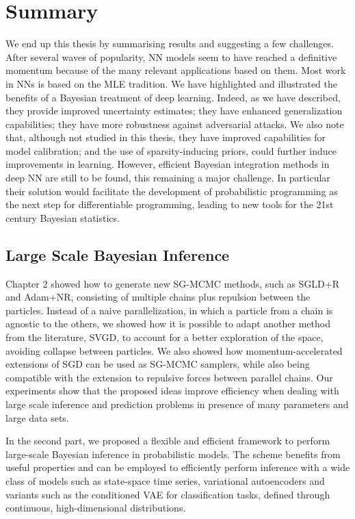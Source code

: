 \section{Summary}

We end up this thesis by summarising results and suggesting a few challenges.
After several waves of popularity, NN models seem to 
have reached a definitive momentum because of the many relevant applications
based on them. Most work in NNs is based on the MLE tradition.
We have highlighted and illustrated the benefits of a Bayesian treatment of deep learning. Indeed, as we have described,
they provide improved uncertainty estimates;
they have enhanced generalization capabilities; 
they have more robustness against adversarial attacks.
We also note that, although not studied in this thesis, 
they have improved capabilities for model calibration;
and the use of sparsity-inducing priors, could further induce 
improvements in learning. 
However, efficient Bayesian integration methods in 
deep NN are 
still to be found, this remaining a major challenge.
In particular their solution would facilitate the
development of probabilistic programming \parencite{gordon2014probabilistic,carpenter2017stan,wood2014new}
as the next step for differentiable programming,
leading to new tools for the 21st century Bayesian 
statistics.


\subsection{Large Scale Bayesian Inference}\label{sec:conclusion_lsb}

Chapter 2 showed how to generate new SG-MCMC methods, such as SGLD+R and Adam+NR, consisting of multiple chains plus repulsion between the particles. Instead of a naive parallelization, in which a particle from a chain is agnostic to the others, we showed how it is possible to adapt another method from the literature, SVGD, to account for a better exploration of the space, avoiding collapse between particles. We also showed how momentum-accelerated extensions of SGD can be used as SG-MCMC samplers, while also being compatible with the extension to repulsive forces between parallel chains. Our 
experiments show that the proposed ideas improve efficiency when dealing 
with large scale inference and prediction problems in presence of many 
parameters and large data sets.

In the second part, we  proposed a flexible and efficient framework to perform
large-scale Bayesian inference in probabilistic models. The scheme benefits from useful properties and can be 
employed to efficiently perform inference with a wide class of models such as state-space time series, variational autoencoders {and variants such as the conditioned VAE for classification tasks}, defined through continuous, high-dimensional distributions.


